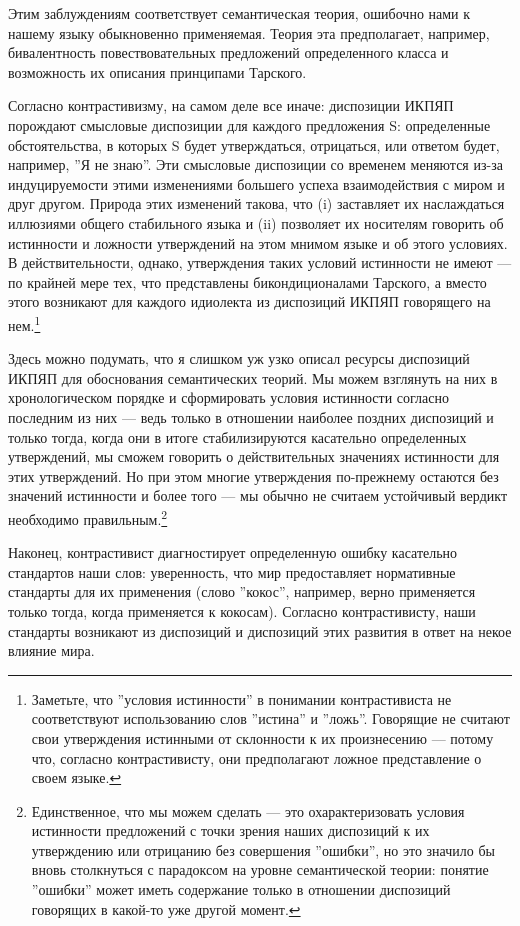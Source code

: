 \documentclass[11pt]{book}
\begin{document}
Этим заблуждениям соответствует семантическая теория, ошибочно нами к нашему языку обыкновенно применяемая. Теория эта предполагает, например, бивалентность повествовательных предложений определенного класса и возможность их описания принципами Тарского.

Согласно контрастивизму, на самом деле все иначе: диспозиции ИКПЯП порождают смысловые диспозиции для каждого предложения S: определенные обстоятельства, в которых S будет утверждаться, отрицаться, или ответом будет, например,  ''Я не знаю''. Эти смысловые диспозиции со временем меняются из-за индуцируемости этими изменениями большего успеха взаимодействия с миром и друг другом. Природа этих изменений такова, что (i) заставляет их наслаждаться иллюзиями общего стабильного языка и (ii) позволяет их носителям говорить об истинности и ложности утверждений на этом мнимом языке и об этого условиях. В действительности, однако, утверждения таких условий истинности не имеют --- по крайней мере тех, что представлены бикондиционалами Тарского, а вместо этого возникают для каждого идиолекта из диспозиций ИКПЯП говорящего на нем.\footnote{Заметьте, что ''условия истинности'' в понимании контрастивиста не соответствуют использованию слов ''истина'' и ''ложь''. Говорящие не считают свои утверждения истинными от склонности к их произнесению --- потому что, согласно контрастивисту, они предполагают ложное представление о своем языке.}

Здесь можно подумать, что я слишком уж узко описал ресурсы диспозиций ИКПЯП для обоснования семантических теорий. Мы можем взглянуть на них в хронологическом порядке и сформировать условия истинности согласно последним из них --- ведь только в отношении наиболее поздних диспозиций и только тогда, когда они в итоге стабилизируются касательно определенных утверждений, мы сможем говорить о действительных значениях истинности для этих утверждений. Но при этом многие утверждения по-прежнему остаются без значений истинности и более того --- мы обычно не считаем устойчивый вердикт необходимо правильным.\footnote{Единственное, что мы можем сделать --- это охарактеризовать условия истинности предложений с точки зрения наших диспозиций к их утверждению или отрицанию без совершения ''ошибки'', но это значило бы вновь столкнуться с парадоксом на уровне семантической теории: понятие ''ошибки'' может иметь содержание только в отношении диспозиций говорящих в какой-то уже другой момент.}

Наконец, контрастивист диагностирует определенную ошибку касательно стандартов наши слов: уверенность, что мир предоставляет нормативные стандарты для их применения (слово ''кокос'', например, верно применяется только тогда, когда применяется к кокосам). Согласно контрастивисту, наши стандарты возникают из диспозиций и диспозиций этих развития в ответ на некое влияние мира.
\end{document}
